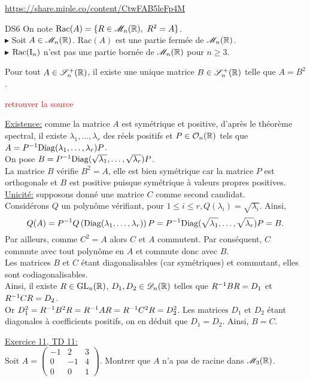 \url{https://share.miple.co/content/CtwFAB5leFp4M}

\begin{box_titre}{DS6}
    On note $\mathrm{Rac}(A) = \{ R \in \mathscr{M}_n(\mathbb{R}),\ R^2 = A \}$. \\
    $\blacktriangleright$ Soit $A \in \mathscr{M}_n(\mathbb{R})$. $\mathrm{Rac}(A)$ est une partie fermée de $\mathscr{M}_n(\mathbb{R})$. \\
    $\blacktriangleright$ $\mathrm{Rac}(\mathrm{I}_n)$ n'est pas une partie bornée de $\mathscr{M}_n(\mathbb{R})$ pour $n \geqslant 3$. 
\end{box_titre}

\begin{prop}
    Pour tout $A \in \mathscr{S}_n^+(\mathbb{R})$, il existe une unique matrice $B \in \mathscr{S}_n^+(\mathbb{R})$ telle que $A = B^2$. 
\end{prop}
\textcolor{red}{retrouver la source}
\begin{preuve}
    \underline{Existence:} comme la matrice $A$ est symétrique et positive, d'après le théorème spectral, il existe $\lambda_1, \dots, \lambda_r$ des réels positifs et $P \in \mathcal{O}_n(\mathbb{R})$ tels que $A = P^{-1} \mathrm{Diag}(\lambda_1, \dots, \lambda_r) P$. \\
    On pose $B = P^{-1} \mathrm{Diag}(\sqrt{\lambda_1}, \dots, \sqrt{\lambda_r}) P$. \\
    La matrice $B$ vérifie $B^2 = A$, elle est bien symétrique car la matrice $P$ est orthogonale et $B$ est positive puisque symétrique à valeurs propres positives. \\
    \underline{Unicité:} supposons donné une matrice $C$ comme second candidat. \\
    Considérons $Q$ un polynôme vérifiant, pour $1 \leqslant i \leqslant r, Q(\lambda_i) = \sqrt{\lambda_i}$. Ainsi, 
    $$Q(A) = P^{-1} Q\left(\mathrm{Diag}(\lambda_1, \dots, \lambda_r)\right) P = P^{-1} \mathrm{Diag}(\sqrt{\lambda_1}, \dots, \sqrt{\lambda_r}) P = B.$$
    Par ailleurs, comme $C^2 = A$ alors $C$ et $A$ commutent. Par conséquent, $C$ commute avec tout polynôme en $A$ et commute donc avec $B$. \\
    Les matrices $B$ et $C$ étant diagonalisables (car symétriques) et commutant, elles sont codiagonalisables. \\
    Ainsi, il existe $R \in \mathrm{GL}_n(\mathbb{R})$, $D_1, D_2 \in \mathscr{D}_n(\mathbb{R})$ telles que $R^{-1}BR = D_1$ et $R^{-1}CR = D_2$. \\
    Or $D_1^2 = R^{-1} B^2 R = R^{-1} A R = R^{-1} C^2 R = D_2^2$. Les matrices $D_1$ et $D_2$ étant diagonales à coefficients positifs, on en déduit que $D_1 = D_2$. Ainsi, $B = C$.
\end{preuve}

\begin{exercice}
    \underline{Exercice 11, TD 11:}\\
    Soit $A = 
    \begin{pmatrix}
        -1 & 2 & 3 \\
        0 & - 1 & 4 \\
        0 & 0 & 1
    \end{pmatrix}. 
    $ Montrer que $A$ n'a pas de racine dans $\mathscr{M}_3(\mathbb{R})$. 
\end{exercice}
